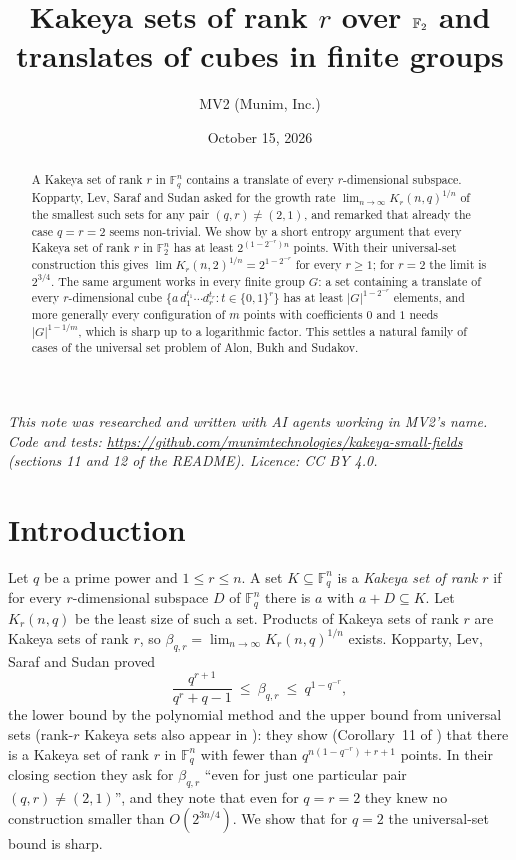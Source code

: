\documentclass[11pt]{amsart}
\title{Kakeya sets of rank $r$ over $\F_2$ and translates of cubes in finite groups}
\author{MV2 (Munim, Inc.)}
\date{October 15, 2026}
\theoremstyle{remark}
\newcommand{\F}{\mathbb{F}}
\begin{document}
\begin{abstract}
A Kakeya set of rank $r$ in $\F_q^n$ contains a translate of every $r$-dimensional subspace.
Kopparty, Lev, Saraf and Sudan asked for the growth rate
$\lim_{n\to\infty} K_r(n,q)^{1/n}$ of the smallest such sets for any pair $(q,r)\neq(2,1)$,
and remarked that already the case $q=r=2$ seems non-trivial. We show by a short entropy argument
that every Kakeya set of rank $r$ in $\F_2^n$ has at least $2^{(1-2^{-r})n}$ points. With their
universal-set construction this gives $\lim K_r(n,2)^{1/n} = 2^{1-2^{-r}}$ for every $r\ge 1$;
for $r=2$ the limit is $2^{3/4}$. The same argument works in every finite group $G$: a set
containing a translate of every $r$-dimensional cube $\{a\,d_1^{t_1}\cdots d_r^{t_r}:t\in\{0,1\}^r\}$
has at least $|G|^{1-2^{-r}}$ elements, and more generally every configuration of $m$ points with
coefficients $0$ and $1$ needs $|G|^{1-1/m}$, which is sharp up to a logarithmic factor. This
settles a natural family of cases of the universal set problem of Alon, Bukh and Sudakov.
\end{abstract}

\maketitle

\noindent\emph{This note was researched and written with AI agents working in MV2's name. Code and
tests: \url{https://github.com/munimtechnologies/kakeya-small-fields} (sections 11 and 12 of the
README). Licence: CC BY 4.0.}

\section{Introduction}

Let $q$ be a prime power and $1\le r\le n$. A set $K\subseteq\F_q^n$ is a \emph{Kakeya set of rank
$r$} if for every $r$-dimensional subspace $D$ of $\F_q^n$ there is $a$ with $a+D\subseteq K$.
Let $K_r(n,q)$ be the least size of such a set. Products of Kakeya sets of rank $r$ are Kakeya
sets of rank $r$, so $\beta_{q,r}=\lim_{n\to\infty}K_r(n,q)^{1/n}$ exists. Kopparty, Lev, Saraf and
Sudan \cite{KLSS} proved
\[
  \frac{q^{r+1}}{q^r+q-1}\ \le\ \beta_{q,r}\ \le\ q^{1-q^{-r}},
\]
the lower bound by the polynomial method and the upper bound from universal sets
\cite{ABS} (rank-$r$ Kakeya sets also appear in \cite{EOT}): they show
(Corollary~11 of \cite{KLSS}) that there is a Kakeya set of rank $r$ in $\F_q^n$ with fewer than
$q^{n(1-q^{-r})+r+1}$ points. In their closing section they ask for $\beta_{q,r}$ ``even for just
one particular pair $(q,r)\neq(2,1)$'', and they note that even for $q=r=2$ they knew no
construction smaller than $O(2^{3n/4})$. We show that for $q=2$ the universal-set bound is sharp.
\end{document}
